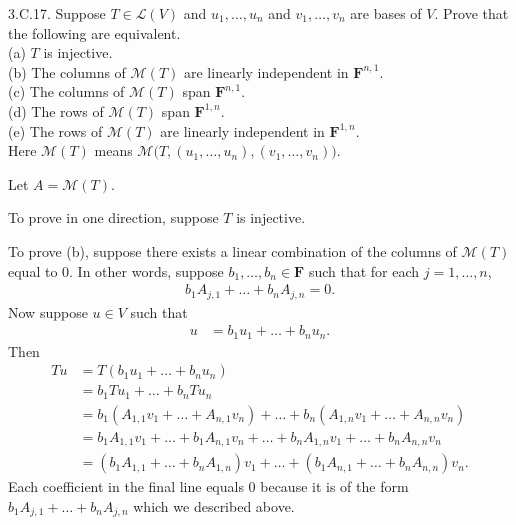 \documentclass[a5paper]{article}
\begin{document}
\newcommand   \C           {\mathbf{C}}
\newcommand   \R           {\mathbf{R}}
\renewcommand \L           {\mathcal{L}}
\newcommand   \F           {\mathbf{F}}
\renewcommand \P           {\mathcal{P}}
\newcommand   \M           {\mathcal{M}}
\newcommand   \op          {\operatorname}


    3.C.17.
    Suppose $T \in \L(V)$ and $u_1,\dots,u_n$ and $v_1,\dots,v_n$ are bases of $V$.
    Prove that the following are equivalent. \\
    (a) $T$ is injective. \\
    (b) The columns of $\M(T)$ are linearly independent in $\F^{n,1}$. \\
    (c) The columns of $\M(T)$ span $\F^{n,1}$. \\
    (d) The rows of $\M(T)$ span $\F^{1,n}$. \\
    (e) The rows of $\M(T)$ are linearly independent in $\F^{1,n}$. \\
    Here $\M(T)$ means $\M\big(T,(u_1,\dots,u_n),(v_1,\dots,v_n)\big)$.

    Let $A = \M(T)$.

    To prove in one direction, suppose $T$ is injective.

    To prove (b), suppose there exists a linear combination of the columns of $\M(T)$ equal to 0.
    In other words, suppose $b_1,\dots,b_n \in \F$ such that for each $j = 1,\dots,n$,
\begin{align*}
        b_1 A_{j,1} + \dots + b_n A_{j,n} = 0 .
\end{align*}
    Now suppose $u \in V$ such that
\begin{align*}
        u &= b_1 u_1 + \dots + b_n u_n .
\end{align*}
    Then
\begin{align*}
        Tu &= T(b_1u_1 + \dots + b_nu_n) \\
           &= b_1Tu_1 + \dots + b_nTu_n \\
           &= b_1(A_{1,1}v_1 + \dots + A_{n,1}v_n) + \dots + b_n(A_{1,n}v_1 + \dots + A_{n,n}v_n) \\
           &= b_1A_{1,1}v_1 + \dots + b_1A_{n,1}v_n + \dots + b_nA_{1,n}v_1 + \dots + b_nA_{n,n}v_n \\
           &= (b_1A_{1,1} + \dots + b_nA_{1,n})v_1 + \dots + (b_1A_{n,1} + \dots + b_nA_{n,n})v_n .
\end{align*}
    Each coefficient in the final line equals 0 because it is of the form $b_1 A_{j,1} + \dots + b_n A_{j,n}$ which we described above.
\end{document}
